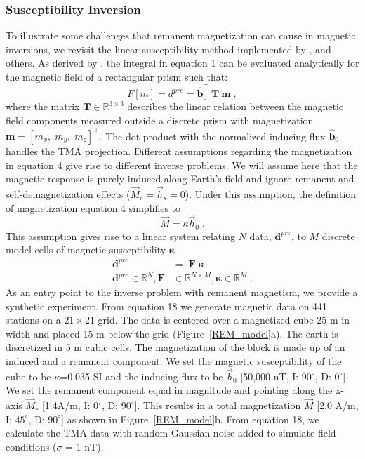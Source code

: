 \documentclass[paper]{geophysics}
\begin{document}
\subsubsection{Susceptibility Inversion}
To illustrate some challenges that remanent magnetization can cause in magnetic inversions, we revisit the linear susceptibility method implemented by \cite{LiOldenburg1996}, \cite{Pilkington97} and others.
As derived by \cite{Sharma66}, the integral in equation 1 can be evaluated analytically for the magnetic field of a rectangular prism such that:
\begin{equation}\label{TMIdatum}
F[m] = d^{pre} = \mathbf{\hat b}_0^\top \: \mathbf{T} \:\mathbf{m}\;,
\end{equation}
where the matrix $\mathbf{T} \in \mathbb{R}^{3 \times 3}$ describes the linear relation between the magnetic field components measured outside a discrete prism with magnetization $\mathbf{m} = [m_x,\;m_y,\;m_z]^\top$. The dot product with the normalized inducing flux $\mathbf{\hat b}_0$ handles the TMA projection.
Different assumptions regarding the magnetization in equation 4 give rise to different inverse problems.
We will assume here that the magnetic response is purely induced along Earth's field and ignore remanent and self-demagnetization effects ($\vec{M}_{r}=\vec{h}_s=0$).
Under this assumption, the definition of magnetization equation 4 simplifies to
\begin{equation*}\label{Fwr_Susc}
\vec{M}= \kappa \vec{h}_0\;.
\end{equation*}
This assumption gives rise to a linear system relating $N$ data, $\mathbf{d}^{pre}$, to $M$ discrete model cells of magnetic susceptibility $\boldsymbol \kappa$
\begin{equation}\label{datatmi}
\begin{split}
	\mathbf{d}^{pre}&= \;\mathbf{F\;\boldsymbol{\kappa}} \\
\mathbf{d}^{pre} \in \mathbb{R}^{N},\mathbf{F}& \in \mathbb{R}^{N \times M}, \boldsymbol{\kappa} \in \mathbb{R}^{M}\;.
\end{split}
\end{equation}
As an entry point to the inverse problem with remanent magnetism, we provide a synthetic experiment. From equation 18 we generate magnetic data on 441 stations on a $21 \times 21$ grid. The data is centered over a magnetized cube 25 m in width and placed 15 m below the grid (Figure~\ref{REM_model}a). The earth is discretized in 5 m cubic cells. The magnetization of the block is made up of an induced and a remanent component. We set the magnetic susceptibility of the cube to be $\kappa$=0.035 SI and the inducing flux to be $\vec{b}_0$ [50,000 nT, I: $90^\circ$, D: $0^\circ$]. We set the remanent component equal in magnitude and pointing along the x-axis $\vec{M}_r$ [1.4\:A/m, I: 0$^\circ$, D: $90^\circ$]. This results in a total magnetization $\vec{M}$ [2.0 A/m, I: $45^\circ$, D: $90^\circ$] as shown in Figure~\ref{REM_model}b. From equation 18, we calculate the TMA data with random Gaussian noise added to simulate field conditions ($\sigma$ = 1 nT).
\end{document}
